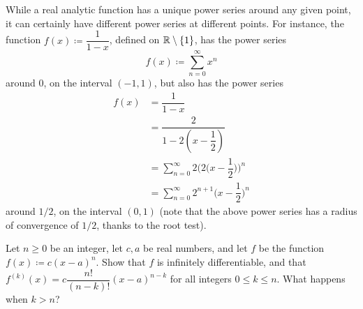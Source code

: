 \begin{rmk}\label{4.2.13}
  While a real analytic function has a unique power series around any given point, it can certainly have different power series at different points.
  For instance, the function \(f(x) \coloneqq \dfrac{1}{1 - x}\), defined on \(\mathbb{R} \setminus \left\lbrace1\right\rbrace\), has the power series
  \[
    f(x) \coloneqq \sum_{n = 0}^\infty x^n
  \]
  around \(0\), on the interval \((-1, 1)\), but also has the power series
  \begin{align*}
    f(x) & = \dfrac{1}{1 - x}                                                  \\
         & = \dfrac{2}{1 - 2(x - \dfrac{1}{2})}                                \\
         & = \sum_{n = 0}^\infty 2 \bigg(2\bigg(x - \dfrac{1}{2}\bigg)\bigg)^n \\
         & = \sum_{n = 0}^\infty 2^{n + 1} \bigg(x - \dfrac{1}{2}\bigg)^n
  \end{align*}
  around \(1 / 2\), on the interval \((0, 1)\)
  (note that the above power series has a radius of convergence of \(1 / 2\), thanks to the root test).
\end{rmk}

\exercisesection

\begin{ex}\label{ex:4.2.1}
  Let \(n \geq 0\) be an integer, let \(c, a\) be real numbers, and let \(f\) be the function \(f(x) \coloneqq c (x - a)^n\).
  Show that \(f\) is infinitely differentiable, and that \(f^{(k)}(x) = c \dfrac{n!}{(n - k)!} (x - a)^{n - k}\) for all integers \(0 \leq k \leq n\).
  What happens when \(k > n\)?
\end{ex}

